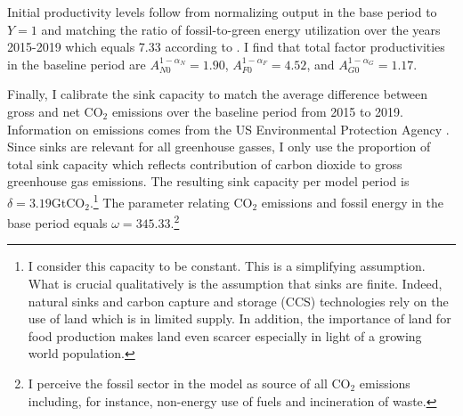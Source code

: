  Initial productivity levels follow from normalizing output in the base period to $Y=1$ and matching the ratio of fossil-to-green energy utilization over the years 2015-2019 which equals 7.33 according to \cite[][Table 1.3]{EIAEnergy}. I find that total factor productivities in the baseline period are $A_{N0}^{1-\alpha_N}=1.90$, $A_{F0}^{1-\alpha_F}=4.52$, and $A_{G0}^{1-\alpha_G}=1.17$. %

Finally, I calibrate the sink capacity to match the average difference between gross and net CO$_2$ emissions over the baseline period from 2015 to 2019. Information on emissions comes from the US Environmental Protection Agency \citep{EPAems}. Since sinks are relevant for all greenhouse gasses, I only use the proportion of total sink capacity which reflects contribution of carbon dioxide to gross greenhouse gas emissions. The resulting sink capacity per model period is $\delta=3.19$GtCO$_2$.\footnote{ I consider this capacity to be constant. This is a simplifying assumption. What is crucial qualitatively is the assumption that sinks are finite. Indeed, natural sinks and carbon capture and storage (CCS) technologies rely on the use of land \citep{VanVuuren2018AlternativeTechnologies} which is in limited supply. In addition, the importance of land for food production makes land even scarcer especially in light of a growing world population.}
The parameter relating CO$_2$ emissions and fossil energy in the base period equals $\omega=345.33$.\footnote{  I perceive the fossil sector in the model as source of all CO$_2$ emissions including, for instance, non-energy use of fuels and incineration of waste.}  

